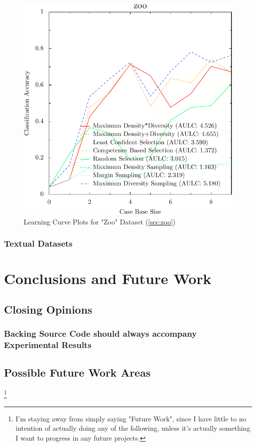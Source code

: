 \documentclass[a4paper,11pt]{report}
\begin{document}
\begin{figure}[h!]
\includegraphics{./Plots/zoo}
\caption{Learning Curve Plots for "Zoo" Dataset (\ref{sec:zoo})}
\end{figure}

\subsection{Textual Datasets}

\chapter{Conclusions and Future Work}

\section{Closing Opinions}
\subsection{Backing Source Code should always accompany Experimental Results}

\section{Possible Future Work Areas} \footnote{I'm staying away from simply saying "Future Work", since I have little to no intention of actually doing any of the following, unless it's actually something I want to progress in any future projects.}
\end{document}
